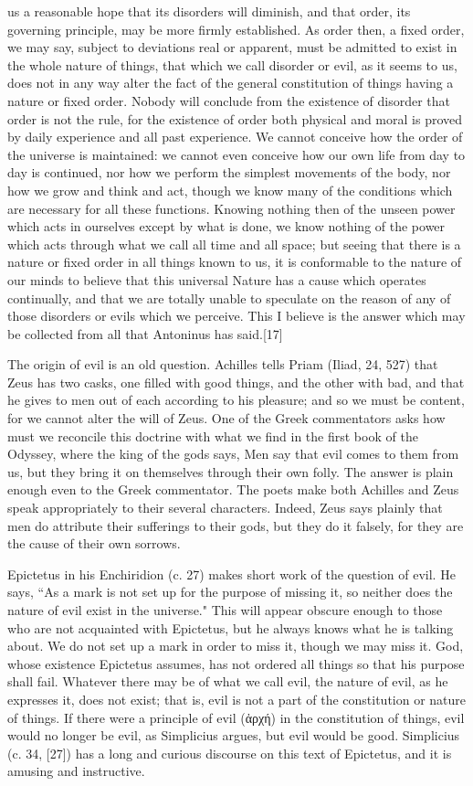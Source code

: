 us a reasonable hope that its disorders will diminish, and that order, its governing principle, may be more firmly established. As order then, a fixed order, we may say, subject to deviations real or apparent, must be admitted to exist in the whole nature of things, that which we call disorder or evil, as it seems to us, does not in any way alter the fact of the general constitution of things having a nature or fixed order. Nobody will conclude from the existence of disorder that order is not the rule, for the existence of order both physical and moral is proved by daily experience and all past experience. We cannot conceive how the order of the universe is maintained: we cannot even conceive how our own life from day to day is continued, nor how we perform the simplest movements of the body, nor how we grow and think and act, though we know many of the conditions which are necessary for all these functions. Knowing nothing then of the unseen power which acts in ourselves except by what is done, we know nothing of the power which acts through what we call all time and all space; but seeing that there is a nature or fixed order in all things known to us, it is conformable to the nature of our minds to believe that this universal Nature has a cause which operates continually, and that we are totally unable to speculate on the reason of any of those disorders or evils which we perceive. This I believe is the answer which may be collected from all that Antoninus has said.[17]

The origin of evil is an old question. Achilles tells Priam (Iliad, 24, 527) that Zeus has two casks, one filled with good things, and the other with bad, and that he gives to men out of each according to his pleasure; and so we must be content, for we cannot alter the will of Zeus. One of the Greek commentators asks how must we reconcile this doctrine with what we find in the first book of the Odyssey, where the king of the gods says, Men say that evil comes to them from us, but they bring it on themselves through their own folly. The answer is plain enough even to the Greek commentator. The poets make both Achilles and Zeus speak appropriately to their several characters. Indeed, Zeus says plainly that men do attribute their sufferings to their gods, but they do it falsely, for they are the cause of their own sorrows.

Epictetus in his Enchiridion (c. 27) makes short work of the question of evil. He says, ``As a mark is not set up for the purpose of missing it, so neither does the nature of evil exist in the universe." This will appear obscure enough to those who are not acquainted with Epictetus, but he always knows what he is talking about. We do not set up a mark in order to miss it, though we may miss it. God, whose existence Epictetus assumes, has not ordered all things so that his purpose shall fail. Whatever there may be of what we call evil, the nature of evil, as he expresses it, does not exist; that is, evil is not a part of the constitution or nature of things. If there were a principle of evil (\textgreek{ἀρχή}) in the constitution of things, evil would no longer be evil, as Simplicius argues, but evil would be good. Simplicius (c. 34, [27]) has a long and curious discourse on this text of Epictetus, and it is amusing and instructive.

